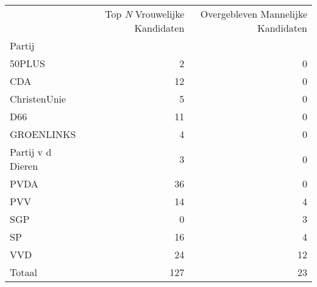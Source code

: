 \begin{tabular}{lrr}
\toprule
{} &  Top \textit{N} Vrouwelijke Kandidaten  &  Overgebleven Mannelijke Kandidaten  \\
Partij                &        &        \\
\midrule
50PLUS                &                              2 &       0 \\
CDA                   &                             12 &       0 \\
ChristenUnie          &                              5 &       0 \\
D66                   &                             11 &       0 \\
GROENLINKS            &                              4 &       0 \\
Partij v d Dieren &                              3 &       0 \\
PVDA                  &                             36 &       0 \\
PVV                   &                             14 &       4 \\
SGP                   &                              0 &       3 \\
SP                    &                             16 &       4 \\
VVD                   &                             24 &      12 \\
\midrule
Totaal                &                            127 &      23 \\
\bottomrule
\end{tabular}
